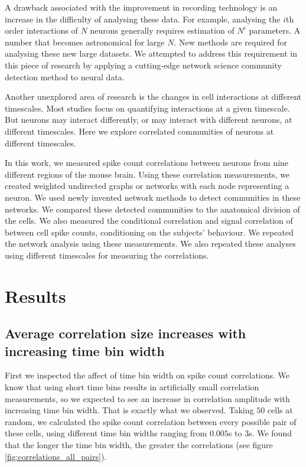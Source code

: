 \documentclass[a4paper,12pt]{article}
\theoremstyle{definition}
\begin{document}
A drawback associated with the improvement in recording technology is an increase in the difficulty of analysing these data. For example, analysing the $i$th order interactions of $N$ neurons generally requires estimation of $N^i$ parameters. A number that becomes astronomical for large $N$. New methods are required for analysing these new large datasets. We attempted to address this requirement in this piece of research by applying a cutting-edge network science community detection method to neural data.

Another unexplored area of research is the changes in cell interactions at different timescales. Most studies focus on quantifying interactions at a given timescale. But neurons may interact differently, or may interact with different neurons, at different timescales. Here we explore correlated communities of neurons at different timescales.

In this work, we measured spike count correlations between neurons from nine different regions of the mouse brain. Using these correlation measurements, we created weighted undirected graphs or networks with each node representing a neuron. We used newly invented network methods to detect communities in these networks. We compared these detected communities to the anatomical division of the cells. We also measured the conditional correlation and signal correlation of between cell spike counts, conditioning on the subjects' behaviour. We repeated the network analysis using these measurements. We also repeated these analyses using different timescales for measuring the correlations.

\section{Results}

    \subsection{Average correlation size increases with increasing time bin width}
    First we inspected the affect of time bin width on spike count correlations. We know that using short time bins results in artificially small correlation measurements\cite{cohen1}, so we expected to see an increase in correlation amplitude with increasing time bin width. That is exactly what we observed. Taking $50$ cells at random, we calculated the spike count correlation between every possible pair of these cells, using different time bin widths ranging from $0.005$s to $3$s. We found that the longer the time bin width, the greater the correlations (see figure \ref{fig:correlations_all_pairs}).
\end{document}
